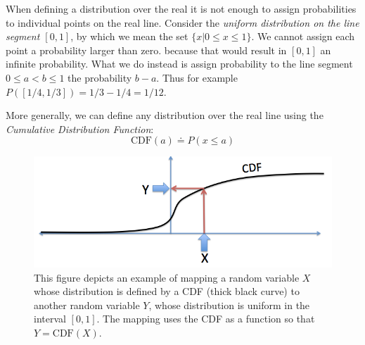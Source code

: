 When defining a distribution over the real it is not enough to assign
probabilities to individual points on the real line. Consider the {\em
  uniform distribution on the line segment $[0,1]$}, by which
we mean the set $\{x | 0 \leq x \leq 1\}$. We cannot assign each
point a probability larger than zero. because that would result in
$[0,1]$ an infinite probability. What we do instead is assign
probability to the line segment $0 \leq a < b \leq 1$ the probability
$b-a$. Thus for example $P([1/4,1/3])=1/3-1/4 = 1/12$.

More generally, we can define any distribution over the real line
using the {\em Cumulative Distribution Function}:
\newcommand{\CDF}{\mbox{CDF}}
\[
\CDF(a) \doteq P(x \leq a)
\]

\begin{figure}[th]
\begin{center}
\includegraphics[width=5in]{figs/CDFmapping.png}
\end{center}
\caption{This figure depicts an example of mapping a random variable
  $X$ whose distribution is defined by a CDF (thick black curve) to
  another random variable $Y$, whose distribution is uniform in the
  interval $[0,1]$. The mapping uses the CDF as a function so that
  $Y=\CDF(X)$. \label{fig:CDFmap}}
\end{figure}

